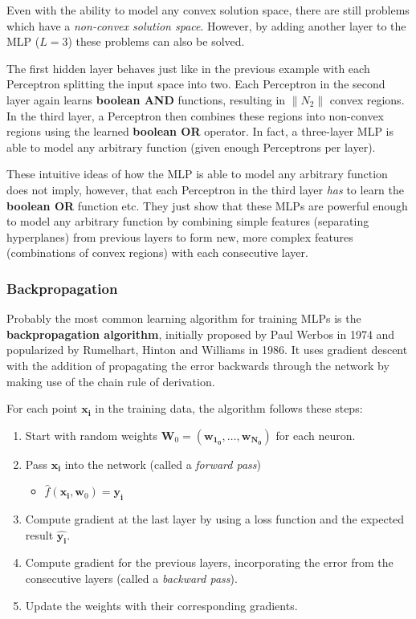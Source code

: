 Even with the ability to model any convex solution space, there are still problems which have a \textit{non-convex solution space}.
However, by adding another layer to the MLP ($L=3$) these problems can also be solved.

The first hidden layer behaves just like in the previous example with each Perceptron splitting the input space into two.
Each Perceptron in the second layer again learns \textbf{boolean AND} functions, resulting in $\lVert N_2 \rVert$ convex regions.
In the third layer, a Perceptron then combines these regions into non-convex regions using the learned \textbf{boolean OR} operator.
In fact, a three-layer MLP is able to model any arbitrary function (given enough Perceptrons per layer).

These intuitive ideas of how the MLP is able to model any arbitrary function does not imply, however, that each Perceptron in the third layer \textit{has} to learn the \textbf{boolean OR} function etc.
They just show that these MLPs are powerful enough to model any arbitrary function by combining simple features (separating hyperplanes) from previous layers to form new, more complex features (combinations of convex regions) with each consecutive layer.

\subsubsection{Backpropagation}

Probably the most common learning algorithm for training MLPs is the \textbf{backpropagation algorithm}, initially proposed by Paul Werbos in 1974 and popularized by Rumelhart, Hinton and Williams in 1986.
It uses gradient descent with the addition of propagating the error backwards through the network by making use of the chain rule of derivation.

For each point $\bm{x_i}$ in the training data, the algorithm follows these steps:

\begin{enumerate}
    \item Start with random weights $\bm{W}_0 = (\bm{w_{1_0}}, \dots, \bm{w_{N_0}})$ for each neuron.
    \item Pass $\bm{x_i}$ into the network (called a \textit{forward pass})
    \begin{itemize}
        \item $\hat{f}(\bm{x_i}, \bm{w}_0) = \bm{y_i}$
    \end{itemize}
    \item Compute gradient at the last layer by using a loss function and the expected result $\hat{\bm{y_i}}$.
    \item Compute gradient for the previous layers, incorporating the error from the consecutive layers (called a \textit{backward pass}).
    \item Update the weights with their corresponding gradients.
\end{enumerate}

